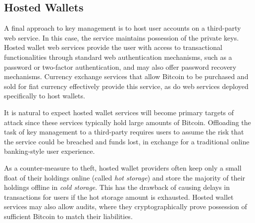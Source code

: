 \subsection{Hosted Wallets} 
A final approach to key management is to host user accounts on a third-party web service. In this case, the service maintains possession of the private keys. Hosted wallet web services provide the user with access to transactional functionalities through standard web authentication mechanisms, such as a password or two-factor authentication, and may also offer password recovery mechanisms. Currency exchange services that allow Bitcoin to be purchased and sold for fiat currency effectively provide this service, as do web services deployed specifically to host wallets.


It is natural to expect hosted wallet services will become primary targets of attack since these services typically hold large amounts of Bitcoin. Offloading the task of key management to a third-party requires users to assume the risk that the service could be breached and funds lost, in exchange for a traditional online banking-style user experience. 

As a counter-measure to theft, hosted wallet providers often keep only a small float of their holdings online (called \textit{hot storage}) and store the majority of their holdings offline in \textit{cold storage}. This has the drawback of causing delays in transactions for users if the hot storage amount is exhausted.
Hosted wallet services may also allow audits, where they cryptographically prove possession of sufficient Bitcoin to match their liabilities.  

